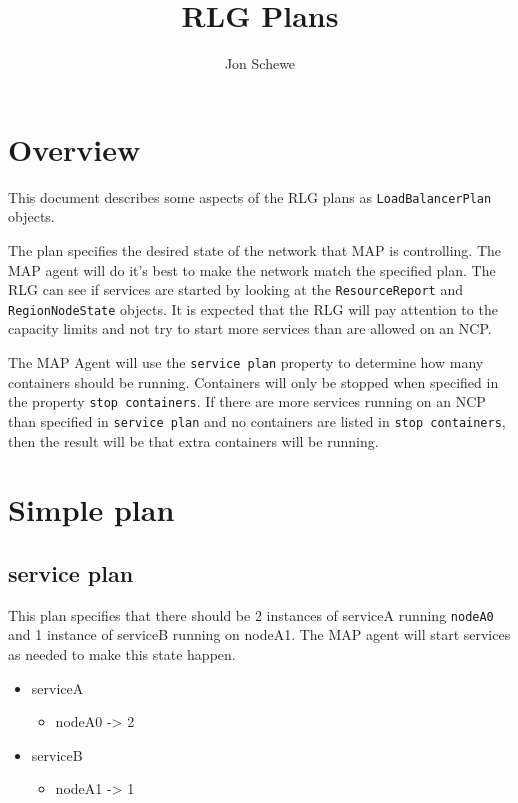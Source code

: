\documentclass[12pt]{article}
\title{RLG Plans}
\author{Jon Schewe}
\begin{document}
\maketitle

\section{Overview}
\label{sec:overview}
This document describes some aspects of the RLG plans as
\texttt{LoadBalancerPlan} objects.

The plan specifies the desired state of the network that MAP is
controlling.
The MAP agent will do it's best to make the network match the specified
plan.
The RLG can see if services are started by looking at the
\texttt{ResourceReport} and \texttt{RegionNodeState} objects.
It is expected that the RLG will pay attention to the capacity limits and
not try to start more services than are allowed on an NCP.

The MAP Agent will use the \texttt{service plan} property to determine how
many containers should be running.  Containers will only be stopped when
specified in the property \texttt{stop containers}.  If there are more
services running on an NCP than specified in \texttt{service plan} and no
containers are listed in \texttt{stop containers}, then the result will be
that extra containers will be running.

\section{Simple plan}
\label{sec:simplePlan}

\subsection{service plan}
This plan specifies that there should be 2 instances of serviceA running
\texttt{nodeA0} and 1 instance of serviceB running on nodeA1. The MAP agent will
start services as needed to make this state happen. 

\begin{itemize}
\item serviceA
  \begin{itemize}
  \item nodeA0 -> 2
  \end{itemize}

\item serviceB
  \begin{itemize}
  \item nodeA1 -> 1
  \end{itemize}

\end{itemize}
\end{document}
